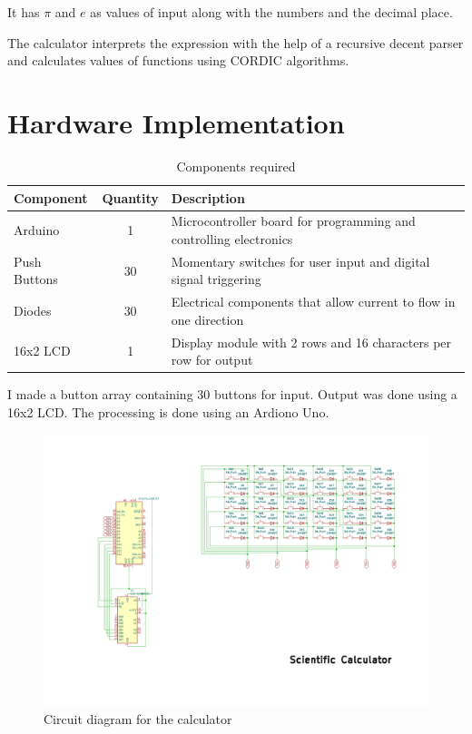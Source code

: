 \documentclass[journal]{IEEEtran}
\begin{document}
It has $\pi$ and $e$ as values of input along with the numbers and the decimal place.

The calculator interprets the expression with the help of a recursive decent parser and calculates values of functions using CORDIC algorithms.


\section{Hardware Implementation}

\begin{table}[!ht]
  \begin{tabular}{|l|c|p{7cm}|}
    \hline
    \textbf{Component} & \textbf{Quantity} & \textbf{Description} \\
    \hline
    Arduino & 1 & Microcontroller board for programming and controlling electronics \\
    Push Buttons & 30 & Momentary switches for user input and digital signal triggering \\
    Diodes & 30 & Electrical components that allow current to flow in one direction \\
    16x2 LCD & 1 & Display module with 2 rows and 16 characters per row for output \\
    \hline
    \end{tabular}
    \caption{Components required}
    \label{table:tab1}
\end{table}

I made a button array containing 30 buttons for input. Output was done using a 16x2 LCD. The processing is done using an Ardiono Uno. 

\begin{figure}[!ht]
  \centering
  \includegraphics[width=1\linewidth]{figs/diag.png}
  \caption{Circuit diagram for the calculator}
  \label{fig:fig1}
\end{figure}
\end{document}
